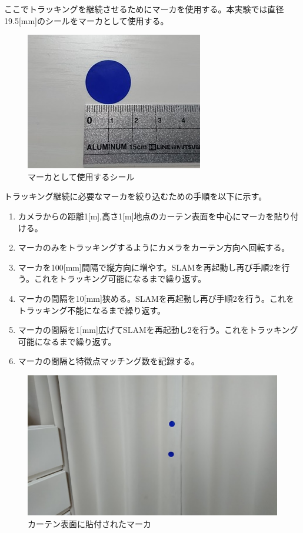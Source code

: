 ここでトラッキングを継続させるためにマーカを使用する。本実験では直径19.5[mm]のシールをマーカとして使用する。

\begin{figure}[h]
        \begin{center}
        \includegraphics[width=0.6\linewidth]{figs/marker01.jpg}
        \caption{マーカとして使用するシール}
        \label{fig:marker01}
        \end{center}
\end{figure}

\newpage

トラッキング継続に必要なマーカを絞り込むための手順を以下に示す。


\begin{enumerate}
   \item カメラからの距離1[m],高さ1[m]地点のカーテン表面を中心にマーカを貼り付ける。
   \item マーカのみをトラッキングするようにカメラをカーテン方向へ回転する。
   \item マーカを100[mm]間隔で縦方向に増やす。SLAMを再起動し再び手順2を行う。これをトラッキング可能になるまで繰り返す。
　 \item マーカの間隔を10[mm]狭める。SLAMを再起動し再び手順2を行う。これをトラッキング不能になるまで繰り返す。
 　\item マーカの間隔を1[mm]広げてSLAMを再起動し2を行う。これをトラッキング可能になるまで繰り返す。
   \item マーカの間隔と特徴点マッチング数を記録する。
\end{enumerate}

\begin{figure}[h]
        \begin{center}
        \includegraphics[width=0.7\linewidth]{figs/marker03.jpg}
        \caption{カーテン表面に貼付されたマーカ}
        \label{fig:marker03}
        \end{center}
\end{figure}

